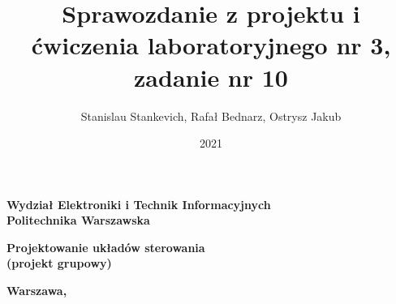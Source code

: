 \documentclass[a4paper,titlepage,11pt,twosides,floatssmall]{mwrep}
\begin{document}
\frenchspacing
\pagestyle{uheadings}

\title{\bf Sprawozdanie z projektu i ćwiczenia laboratoryjnego nr 3, zadanie nr 10\vskip 0.1cm}
\author{Stanislau Stankevich, Rafał Bednarz, Ostrysz Jakub}
\date{2021}

\makeatletter
\renewcommand{\maketitle}{\begin{titlepage}
\begin{center}{\LARGE {\bf
Wydział Elektroniki i Technik Informacyjnych}}\\
\vspace{0.4cm}
{\LARGE {\bf Politechnika Warszawska}}\\
\vspace{0.3cm}
\end{center}
\vspace{5cm}
\begin{center}
{\bf \LARGE Projektowanie układów sterowania\\ (projekt grupowy) \vskip 0.1cm}
\end{center}
\vspace{1cm}
\begin{center}
{\bf \LARGE \@title}
\end{center}
\vspace{2cm}
\begin{center}
{\bf \Large \@author \par}
\end{center}
\vspace*{\stretch{6}}
\begin{center}
\bf{\large{Warszawa, \@date\vskip 0.1cm}}
\end{center}
\end{titlepage}
}
\makeatother

\maketitle

\tableofcontents






\end{document}

